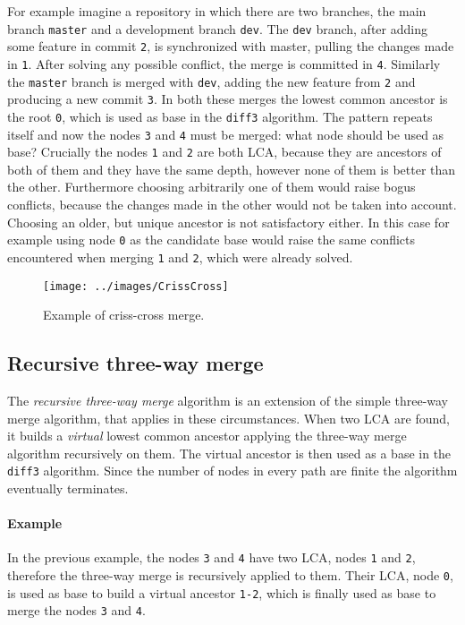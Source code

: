 \documentclass[../Thesis.tex]{subfiles}
\begin{document}
	For example imagine a repository in which there are two branches,
	the main branch \texttt{master} and a development branch \texttt{dev}.
	The \texttt{dev} branch, after adding some feature in commit \texttt{2},
	is synchronized with master, pulling the changes made in \texttt{1}.
	After solving any possible conflict, the merge is committed in \texttt{4}.
	Similarly the \texttt{master} branch is merged with \texttt{dev}, 
	adding the new feature from \texttt{2} and producing a new commit 
	\texttt{3}.
	In both these merges the lowest common ancestor is the root \texttt{0},
	which is used as base in the \texttt{diff3} algorithm.
	The pattern repeats itself and now the nodes \texttt{3} and \texttt{4}
	must be merged: what node should be used as base?
	Crucially the nodes \texttt{1} and \texttt{2} are both LCA, because they are 
	ancestors of both of them and they have the same depth, however
	none of them is better than the other.
	Furthermore choosing arbitrarily one of them would raise bogus conflicts,
	because the changes made in the other would not be taken into account.
	Choosing an older, but unique ancestor is not satisfactory either.
	In this case for example using node \texttt{0} as the candidate base would
	raise the same conflicts encountered when merging \texttt{1} and \texttt{2},
	which were already solved.
	
\begin{figure}[h]
\centering
\texttt{[image: ../images/CrissCross]}
\caption{Example of criss-cross merge.}
\label{CrissCrossImg}
\end{figure}
	
	\subsection{Recursive three-way merge}
	The \emph{recursive three-way merge} algorithm is an extension
	of the simple three-way merge algorithm, that applies in these
	circumstances.
	When two LCA are found, it builds a \emph{virtual} lowest common 
	ancestor applying the three-way merge algorithm recursively on them.
	The virtual ancestor is then used as a base in the \texttt{diff3} algorithm.
	Since the number of nodes in every path are finite the algorithm 
	eventually terminates.

	\paragraph{Example}
	In the previous example, the nodes \texttt{3} and \texttt{4} have
	two LCA, nodes \texttt{1} and \texttt{2}, therefore the three-way merge 
	is recursively applied to them. Their LCA, node \texttt{0}, is used as base
	to build a virtual ancestor \texttt{1-2}, which is finally used as base to 
	merge the nodes \texttt{3} and \texttt{4}.
	
\end{document}
